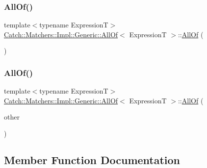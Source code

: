 \subsubsection{\texorpdfstring{All\+Of()}{AllOf()}\hspace{0.1cm}{\footnotesize\ttfamily [1/2]}}
{\footnotesize\ttfamily template$<$typename ExpressionT$>$ \\
\hyperlink{class_catch_1_1_matchers_1_1_impl_1_1_generic_1_1_all_of}{Catch\+::\+Matchers\+::\+Impl\+::\+Generic\+::\+All\+Of}$<$ ExpressionT $>$\+::\hyperlink{class_catch_1_1_matchers_1_1_impl_1_1_generic_1_1_all_of}{All\+Of} (\begin{DoxyParamCaption}{ }\end{DoxyParamCaption})\hspace{0.3cm}{\ttfamily [inline]}}

\hypertarget{class_catch_1_1_matchers_1_1_impl_1_1_generic_1_1_all_of_a31f7c5e570e79bdf64064ee87c331a59}{}\label{class_catch_1_1_matchers_1_1_impl_1_1_generic_1_1_all_of_a31f7c5e570e79bdf64064ee87c331a59} 
\subsubsection{\texorpdfstring{All\+Of()}{AllOf()}\hspace{0.1cm}{\footnotesize\ttfamily [2/2]}}
{\footnotesize\ttfamily template$<$typename ExpressionT$>$ \\
\hyperlink{class_catch_1_1_matchers_1_1_impl_1_1_generic_1_1_all_of}{Catch\+::\+Matchers\+::\+Impl\+::\+Generic\+::\+All\+Of}$<$ ExpressionT $>$\+::\hyperlink{class_catch_1_1_matchers_1_1_impl_1_1_generic_1_1_all_of}{All\+Of} (\begin{DoxyParamCaption}\item[{\hyperlink{class_catch_1_1_matchers_1_1_impl_1_1_generic_1_1_all_of}{All\+Of}$<$ ExpressionT $>$ const \&}]{other }\end{DoxyParamCaption})\hspace{0.3cm}{\ttfamily [inline]}}



\subsection{Member Function Documentation}
\hypertarget{class_catch_1_1_matchers_1_1_impl_1_1_generic_1_1_all_of_a8c5cd1e494ab697076da418ee72ac297}{}\label{class_catch_1_1_matchers_1_1_impl_1_1_generic_1_1_all_of_a8c5cd1e494ab697076da418ee72ac297} 
